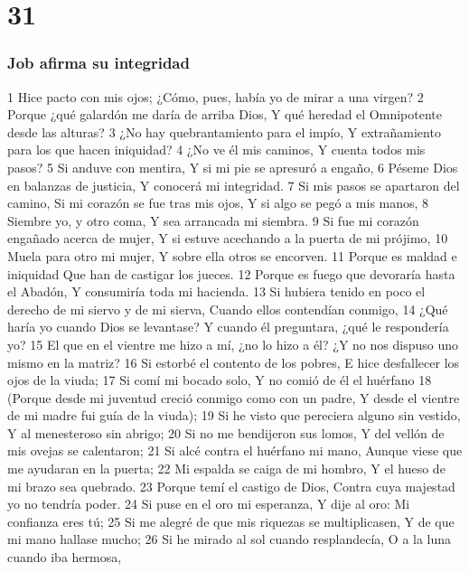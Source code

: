 \chapter{31}

\subsection*{Job afirma su integridad}  

1 Hice pacto con mis ojos;  
¿Cómo, pues, había yo de mirar a una virgen?  
2 Porque ¿qué galardón me daría de arriba Dios,  
Y qué heredad el Omnipotente desde las alturas?  
3 ¿No hay quebrantamiento para el impío,  
Y extrañamiento para los que hacen iniquidad?  
4 ¿No ve él mis caminos,  
Y cuenta todos mis pasos?  
5 Si anduve con mentira,  
Y si mi pie se apresuró a engaño,  
6 Péseme Dios en balanzas de justicia,  
Y conocerá mi integridad.  
7 Si mis pasos se apartaron del camino,  
Si mi corazón se fue tras mis ojos,  
Y si algo se pegó a mis manos,  
8 Siembre yo, y otro coma,  
Y sea arrancada mi siembra.  
9 Si fue mi corazón engañado acerca de mujer,  
Y si estuve acechando a la puerta de mi prójimo, 
10 Muela para otro mi mujer,  
Y sobre ella otros se encorven.  
11 Porque es maldad e iniquidad  
Que han de castigar los jueces.  
12 Porque es fuego que devoraría hasta el Abadón,  
Y consumiría toda mi hacienda.  
13 Si hubiera tenido en poco el derecho de mi siervo y de mi sierva,  
Cuando ellos contendían conmigo,  
14 ¿Qué haría yo cuando Dios se levantase?  
Y cuando él preguntara, ¿qué le respondería yo?  
15 El que en el vientre me hizo a mí, ¿no lo hizo a él?  
¿Y no nos dispuso uno mismo en la matriz?  
16 Si estorbé el contento de los pobres,  
E hice desfallecer los ojos de la viuda;  
17 Si comí mi bocado solo,  
Y no comió de él el huérfano  
18 (Porque desde mi juventud creció conmigo como con un padre,  
Y desde el vientre de mi madre fui guía de la viuda);  
19 Si he visto que pereciera alguno sin vestido,  
Y al menesteroso sin abrigo;  
20 Si no me bendijeron sus lomos,  
Y del vellón de mis ovejas se calentaron;  
21 Si alcé contra el huérfano mi mano,  
Aunque viese que me ayudaran en la puerta;  
22 Mi espalda se caiga de mi hombro,  
Y el hueso de mi brazo sea quebrado.  
23 Porque temí el castigo de Dios,  
Contra cuya majestad yo no tendría poder.  
24 Si puse en el oro mi esperanza,  
Y dije al oro: Mi confianza eres tú;  
25 Si me alegré de que mis riquezas se multiplicasen,  
Y de que mi mano hallase mucho;  
26 Si he mirado al sol cuando resplandecía,  
O a la luna cuando iba hermosa,  

